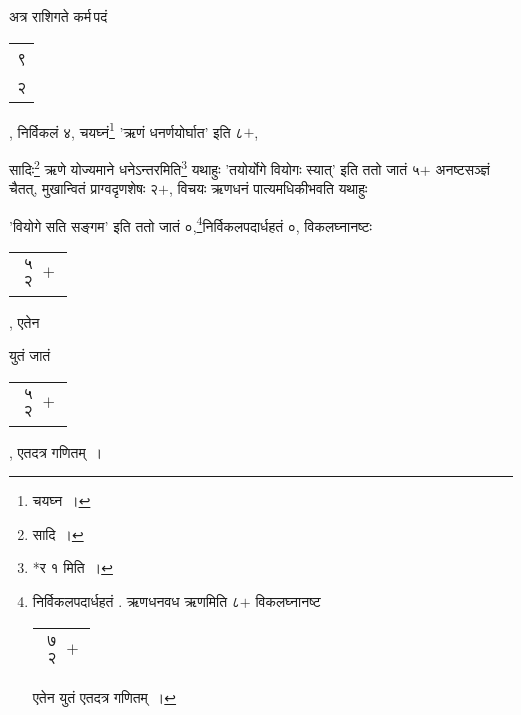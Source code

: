 \documentclass[10pt, openany]{book}
\begin{document}
{{{{{{{{{{{अत्र राशिगते कर्म\textendash \,पदं\begin{tabular}{c} ९\\ २\end{tabular}, निर्विकलं ४, चयघ्नं\renewcommand{\thefootnote}{२}\footnote{चयघ्न~।} {\qt 'ऋणं धनर्णयोर्घात'} इति ८$+$,}
{सादिः\renewcommand{\thefootnote}{३}\footnote{सादि~।} ऋणे योज्यमाने धनेऽन्तरमिति\renewcommand{\thefootnote}{४}\footnote{*र १ मिति~।} यथाहुः {\qt 'तयोर्योगे वियोगः स्यात्'} इति ततो जातं ५$+$}
{अनष्टसञ्ज्ञं चैतत्, मुखान्वितं प्राग्वदृणशेषः २$+$, विचयः ऋणधनं
पात्यमधिकीभवति यथाहुः}
{{\qt 'वियोगे सति सङ्गम'} इति ततो जातं ०,\renewcommand{\thefootnote}{५}\footnote{निर्विकलपदार्धहतं . ऋणधनवध 
ऋणमिति ८$+$ विकलघ्नानष्ट \begin{tabular}{c|}$\begin{matrix}
\mbox{{७}}\\
\mbox{{२}}
\end{matrix}+$\\\hline \end{tabular} एतेन युतं एतदत्र गणितम्~।}निर्विकलपदार्धहतं ०,
विकलघ्नानष्टः\begin{tabular}{c}$\begin{matrix}
\mbox{{५}}\\
\mbox{{२}}
\end{matrix}+$\end{tabular}, एतेन}
{युतं जातं\begin{tabular}{c}$\begin{matrix}
\mbox{{५}}\\
\mbox{{२}}
\end{matrix}+$\end{tabular}, एतदत्र गणितम्~।}
\vspace{2mm}

}}}}}}}}}}
\end{document}
